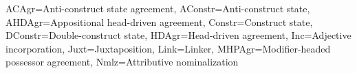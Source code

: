 
\begin{flushleft}
ACAgr=Anti\hyp{}construct state agreement, AConstr=Anti\hyp{}construct state, AHDAgr=Appositional head\hyp{}driven agreement, Constr=Construct state, DConstr=Double\hyp{}construct state, HDAgr=Head\hyp{}driven agreement, Inc=Adjective incorporation, Juxt=Juxtaposition, Link=Linker, MHPAgr=Modifier\hyp{}headed possessor agreement, Nmlz=Attributive nominalization
\end{flushleft}

